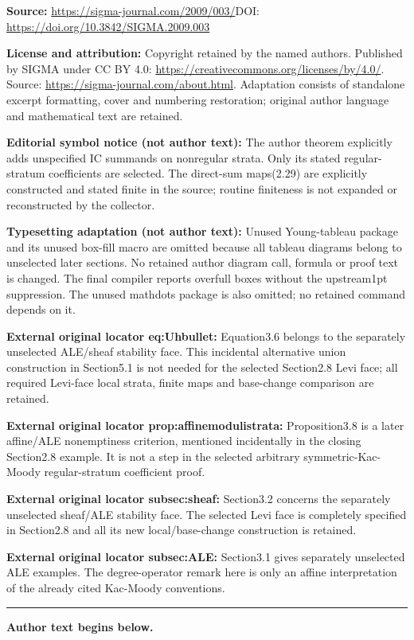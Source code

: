 \documentclass[11pt]{article}
\theoremstyle{definition}
\numberwithin{equation}{section}
\begin{document}
\noindent\textbf{Source:} \url{https://sigma-journal.com/2009/003/}\quad DOI: \url{https://doi.org/10.3842/SIGMA.2009.003}\par
\noindent\textbf{License and attribution:} Copyright retained by the named authors. Published by SIGMA under CC BY 4.0: \url{https://creativecommons.org/licenses/by/4.0/}. Source: \url{https://sigma-journal.com/about.html}. Adaptation consists of standalone excerpt formatting, cover and numbering restoration; original author language and mathematical text are retained.\par
\noindent\textbf{Editorial symbol notice (not author text):} The author theorem explicitly adds unspecified IC summands on nonregular strata. Only its stated regular-stratum coefficients are selected. The direct-sum maps(2.29) are explicitly constructed and stated finite in the source; routine finiteness is not expanded or reconstructed by the collector.\par
\noindent\textbf{Typesetting adaptation (not author text):} Unused Young-tableau package and its unused box-fill macro are omitted because all tableau diagrams belong to unselected later sections. No retained author diagram call, formula or proof text is changed. The final compiler reports overfull boxes without the upstream1pt suppression. The unused mathdots package is also omitted; no retained command depends on it.\par
\noindent\textbf{External original locator eq:Uhbullet:} Equation3.6 belongs to the separately unselected ALE/sheaf stability face. This incidental alternative union construction in Section5.1 is not needed for the selected Section2.8 Levi face; all required Levi-face local strata, finite maps and base-change comparison are retained.\par
\noindent\textbf{External original locator prop:affinemodulistrata:} Proposition3.8 is a later affine/ALE nonemptiness criterion, mentioned incidentally in the closing Section2.8 example. It is not a step in the selected arbitrary symmetric-Kac-Moody regular-stratum coefficient proof.\par
\noindent\textbf{External original locator subsec:sheaf:} Section3.2 concerns the separately unselected sheaf/ALE stability face. The selected Levi face is completely specified in Section2.8 and all its new local/base-change construction is retained.\par
\noindent\textbf{External original locator subsec:ALE:} Section3.1 gives separately unselected ALE examples. The degree-operator remark here is only an affine interpretation of the already cited Kac-Moody conventions.\par
\medskip\hrule\medskip\noindent\textbf{Author text begins below.}\par
\setcounter{section}{1}
\setcounter{subsection}{0}
\setcounter{subsubsection}{0}
\setcounter{equation}{0}
\end{document}

